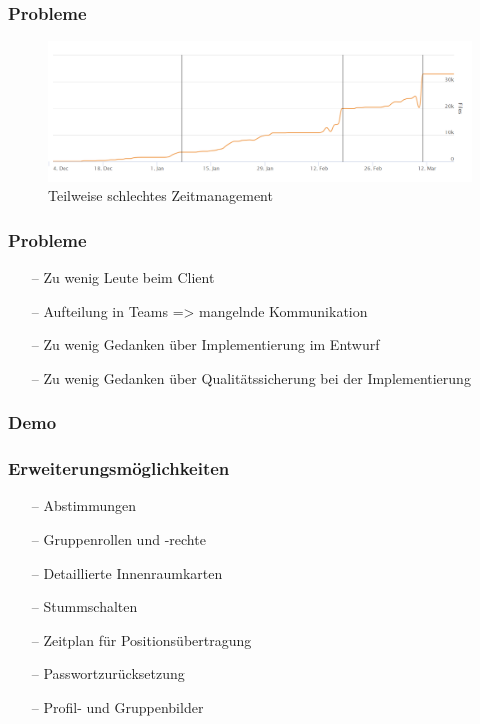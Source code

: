 \documentclass[aspectratio=1610]{beamer}
\begin{document}
     \begin{frame}[plain]
    	\frametitle{\textbf{Probleme}}
     	\begin{figure}
      		\includegraphics[width = \columnwidth - 30pt]{images/loc_deadlines.png}
		\caption{Teilweise schlechtes Zeitmanagement}
    	\end{figure}
    \end{frame}


    \begin{frame}[plain]
        \frametitle{\textbf{Probleme}}
        \begin{itemize}
            \item[--] Zu wenig Leute beim Client
            \item[--] Aufteilung in Teams => mangelnde Kommunikation
            \item[--] Zu wenig Gedanken über Implementierung im Entwurf
            \item[--] Zu wenig Gedanken über Qualitätssicherung bei der Implementierung
        \end{itemize}
    \end{frame}


  \begin{frame}[plain]
      \frametitle{\textbf{Demo}}

  \end{frame}

  \begin{frame}[plain]
      \frametitle{\textbf{Erweiterungsmöglichkeiten}}
        \begin{itemize}
          \item[--] Abstimmungen
          \item[--] Gruppenrollen und -rechte
          \item[--] Detaillierte Innenraumkarten
          \item[--] Stummschalten
          \item[--] Zeitplan für Positionsübertragung
          \item[--] Passwortzurücksetzung
          \item[--] Profil- und Gruppenbilder
        \end{itemize}
  \end{frame}
\end{document}
